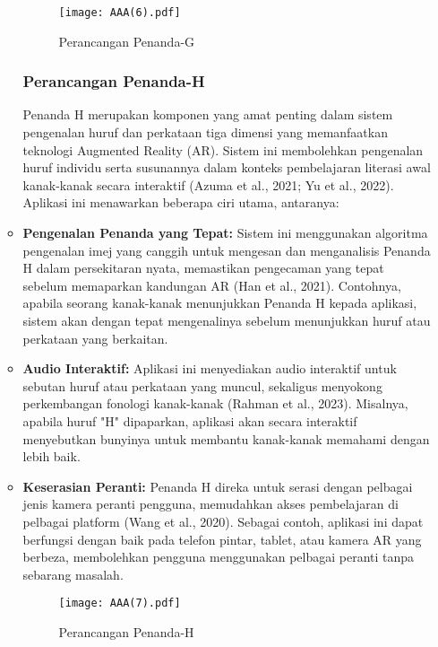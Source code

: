 \begin{itemize}
\begin{itemize}
\begin{figure}
    \centering
    \texttt{[image: AAA(6).pdf]}
    \caption{Perancangan Penanda-G}
    \label{fig:G}
\end{figure}
\clearpage
\subsubsection{Perancangan Penanda-H}

Penanda H merupakan komponen yang amat penting dalam sistem pengenalan huruf dan perkataan tiga dimensi yang memanfaatkan teknologi Augmented Reality (AR). Sistem ini membolehkan pengenalan huruf individu serta susunannya dalam konteks pembelajaran literasi awal kanak-kanak secara interaktif (Azuma et al., 2021; Yu et al., 2022). Aplikasi ini menawarkan beberapa ciri utama, antaranya: \\ 

\item \textbf{Pengenalan Penanda yang Tepat:} Sistem ini menggunakan algoritma pengenalan imej yang canggih untuk mengesan dan menganalisis Penanda H dalam persekitaran nyata, memastikan pengecaman yang tepat sebelum memaparkan kandungan AR (Han et al., 2021). Contohnya, apabila seorang kanak-kanak menunjukkan Penanda H kepada aplikasi, sistem akan dengan tepat mengenalinya sebelum menunjukkan huruf atau perkataan yang berkaitan.  \\
\item \textbf{Audio Interaktif:} Aplikasi ini menyediakan audio interaktif untuk sebutan huruf atau perkataan yang muncul, sekaligus menyokong perkembangan fonologi kanak-kanak (Rahman et al., 2023). Misalnya, apabila huruf "H" dipaparkan, aplikasi akan secara interaktif menyebutkan bunyinya untuk membantu kanak-kanak memahami dengan lebih baik.  \\
\item \textbf{Keserasian Peranti:} Penanda H direka untuk serasi dengan pelbagai jenis kamera peranti pengguna, memudahkan akses pembelajaran di pelbagai platform (Wang et al., 2020). Sebagai contoh, aplikasi ini dapat berfungsi dengan baik pada telefon pintar, tablet, atau kamera AR yang berbeza, membolehkan pengguna menggunakan pelbagai peranti tanpa sebarang masalah. \\ 


\begin{figure}
    \centering
    \texttt{[image: AAA(7).pdf]}
    \caption{Perancangan Penanda-H}
    \label{fig:H}
\end{figure}
\clearpage


\end{itemize}
\end{itemize}
